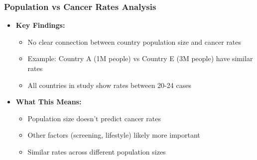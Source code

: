 \begin{frame}
  \frametitle{Population vs Cancer Rates Analysis}
  \begin{itemize}
      \item \textbf{Key Findings:}
      \begin{itemize}
          \item No clear connection between country population size and cancer rates
          \item Example: Country A (1M people) vs Country E (3M people) have similar rates
          \item All countries in study show rates between 20-24 cases
      \end{itemize}
      
      \item \textbf{What This Means:}
      \begin{itemize}
          \item Population size doesn't predict cancer rates
          \item Other factors (screening, lifestyle) likely more important
          \item Similar rates across different population sizes
      \end{itemize}
  \end{itemize}
\end{frame}